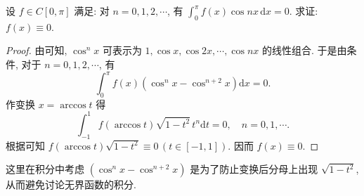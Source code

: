 \documentclass[../../main.tex]{subfiles}
\begin{document}
\begin{example}
设 \( f \in C[0,\pi] \) 满足: 对 \( n = 0,1,2,\cdots \), 有 \( \int_{0}^{\pi} f(x)\cos nx \, \mathrm{d}x = 0 \). 求证: \( f(x) \equiv 0 \).
\end{example}
\begin{proof}
由可知, \( \cos^n x \) 可表示为 \( 1,\cos x,\cos 2x,\cdots,\cos nx \) 的线性组合. 于是由条件, 对于 \( n = 0,1,2,\cdots \), 有
\[
\int_{0}^{\pi} f(x) \left( \cos^n x - \cos^{n + 2} x \right) \mathrm{d}x = 0.
\]
作变换 \( x = \arccos t \) 得
\[
\int_{-1}^{1} f(\arccos t) \sqrt{1 - t^2} \, t^n \mathrm{d}t = 0, \quad n = 0,1,\cdots.
\]
根据可知 \( f(\arccos t) \sqrt{1 - t^2} \equiv 0 \, (t \in [-1,1]) \). 因而 \( f(x) \equiv 0 \).

\end{proof}
\begin{remark}
这里在积分中考虑 \( (\cos^n x - \cos^{n + 2} x) \) 是为了防止变换后分母上出现 \( \sqrt{1 - t^2} \), 从而避免讨论无界函数的积分.
\end{remark}
\end{document}
